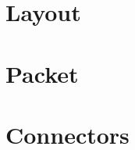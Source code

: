 \documentclass[11pt]{article}
\begin{document}
\section{Layout}
\label{sec:layout}

\section{Packet}
\label{sec:packet}

\section{Connectors}
\label{sec:connectors}
\end{document}
